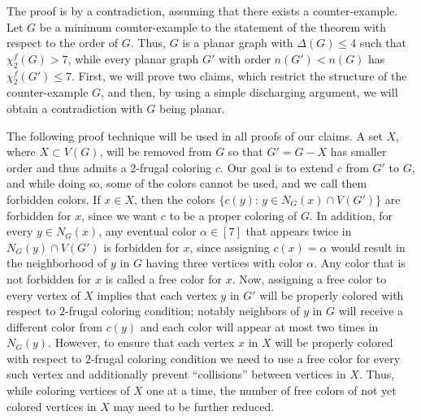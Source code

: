 \documentclass[10pt,a4paper]{article}
\newcommand{\fd}{\chi_{2}^{f}}
\begin{document}
The proof is by a contradiction, assuming that there exists a counter-example. Let $G$ be a minimum counter-example to the statement of the theorem with respect to the order of $G$. Thus, $G$ is a planar graph with $\Delta(G)\le 4$ such that $\fd(G)>7$, while every planar graph $G'$ with order $n(G')<n(G)$ has $\fd(G')\le 7$. First, we will prove two claims, which restrict the structure of the counter-example $G$, and then, by using a simple discharging argument, we will obtain a contradiction with $G$ being planar.

The following proof technique will be used in all proofs of our claims.
A set $X$, where $X\subset V(G)$, will be removed from $G$ so that $G'=G-X$ has smaller order and thus admits a $2$-frugal coloring $c$. Our goal is to extend $c$ from $G'$ to $G$, and while doing so, some of the colors cannot be used, and we call them forbidden colors. If $x\in X$, then the colors $\{c(y):\, y\in N_G(x)\cap V(G')\}$ are forbidden for $x$, since we want $c$ to be a proper coloring of $G$. In addition, for every $y\in N_G(x)$, any eventual color $\alpha\in [7]$ that appears twice in $N_G(y)\cap V(G')$ is forbidden for $x$, since assigning $c(x)=\alpha$ would result in the neighborhood of $y$ in $G$ having three vertices with color $\alpha$. Any color that is not forbidden for $x$ is called a free color for $x$. Now, assigning a free color to every vertex of $X$ implies that each vertex $y$ in $G'$ will be properly colored with respect to $2$-frugal coloring condition; notably neighbors of $y$ in $G$ will receive a different color from $c(y)$ and each color will appear at most two times in $N_G(y)$. However, to ensure that each vertex $x$ in $X$ will be properly colored with respect to $2$-frugal coloring condition we need to use a free color for every such vertex and additionally prevent ``collisions'' between vertices in $X$. Thus, while coloring vertices of $X$ one at a time, the number of free colors of not yet colored vertices in $X$ may need to be further reduced. 
\end{document}
